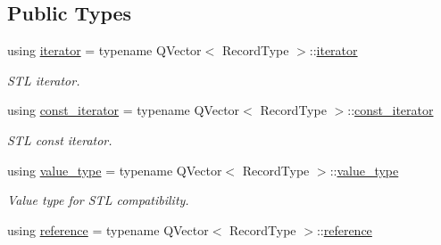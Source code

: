 \subsection*{Public Types}
\begin{DoxyCompactItemize}
\item 
using \hyperlink{class_mdt_1_1_plain_text_1_1_record_list_template_a5b0caae56b05a38e53539cad1da8cd12}{iterator} = typename Q\+Vector$<$ Record\+Type $>$\+::\hyperlink{class_mdt_1_1_plain_text_1_1_record_list_template_a5b0caae56b05a38e53539cad1da8cd12}{iterator}\hypertarget{class_mdt_1_1_plain_text_1_1_record_list_template_a5b0caae56b05a38e53539cad1da8cd12}{}\label{class_mdt_1_1_plain_text_1_1_record_list_template_a5b0caae56b05a38e53539cad1da8cd12}

\begin{DoxyCompactList}\small\item\em S\+TL iterator. \end{DoxyCompactList}\item 
using \hyperlink{class_mdt_1_1_plain_text_1_1_record_list_template_abfba36291fe9cb605ec432ed873ce4ea}{const\+\_\+iterator} = typename Q\+Vector$<$ Record\+Type $>$\+::\hyperlink{class_mdt_1_1_plain_text_1_1_record_list_template_abfba36291fe9cb605ec432ed873ce4ea}{const\+\_\+iterator}\hypertarget{class_mdt_1_1_plain_text_1_1_record_list_template_abfba36291fe9cb605ec432ed873ce4ea}{}\label{class_mdt_1_1_plain_text_1_1_record_list_template_abfba36291fe9cb605ec432ed873ce4ea}

\begin{DoxyCompactList}\small\item\em S\+TL const iterator. \end{DoxyCompactList}\item 
using \hyperlink{class_mdt_1_1_plain_text_1_1_record_list_template_a15ca07bf051f835ce544901a06639990}{value\+\_\+type} = typename Q\+Vector$<$ Record\+Type $>$\+::\hyperlink{class_mdt_1_1_plain_text_1_1_record_list_template_a15ca07bf051f835ce544901a06639990}{value\+\_\+type}\hypertarget{class_mdt_1_1_plain_text_1_1_record_list_template_a15ca07bf051f835ce544901a06639990}{}\label{class_mdt_1_1_plain_text_1_1_record_list_template_a15ca07bf051f835ce544901a06639990}

\begin{DoxyCompactList}\small\item\em Value type for S\+TL compatibility. \end{DoxyCompactList}\item 
using \hyperlink{class_mdt_1_1_plain_text_1_1_record_list_template_a9f3af13db580a27488883003f589489f}{reference} = typename Q\+Vector$<$ Record\+Type $>$\+::\hyperlink{class_mdt_1_1_plain_text_1_1_record_list_template_a9f3af13db580a27488883003f589489f}{reference}\hypertarget{class_mdt_1_1_plain_text_1_1_record_list_template_a9f3af13db580a27488883003f589489f}{}\label{class_mdt_1_1_plain_text_1_1_record_list_template_a9f3af13db580a27488883003f589489f}


\end{DoxyCompactItemize}
